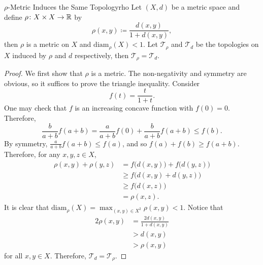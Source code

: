 \documentclass[math]{amznotes}
\theoremstyle{remark}
\begin{document}
\begin{probox}{$\rho$-Metric Induces the Same Topology}{rho}
    Let $\left(X, d\right)$ be a metric space and define $\rho \colon X \times X \to \mathbb{R}$ by 
    \begin{equation*}
        \rho\left(x, y\right) \coloneqq \frac{d\left(x, y\right)}{1 + d\left(x, y\right)},
    \end{equation*}
    then $\rho$ is a metric on $X$ and $\mathrm{diam}_{\rho}\left(X\right) < 1$. Let $\mathcal{T}_{\rho}$ and $\mathcal{T}_d$ be the topologies on $X$ induced by $\rho$ and $d$ respectively, then $\mathcal{T}_{\rho} = \mathcal{T}_d$.
    \tcblower
    \begin{proof}
        We first show that $\rho$ is a metric. The non-negativity and symmetry are obvious, so it suffices to prove the triangle inequality. Consider 
        \begin{equation*}
            f\left(t\right) = \frac{t}{1 + t}.
        \end{equation*}
        One may check that $f$ is an increasing concave function with $f\left(0\right) = 0$. Therefore,
        \begin{equation*}
            \frac{b}{a + b}f\left(a + b\right) = \frac{a}{a + b}f\left(0\right) + \frac{b}{a + b}f\left(a + b\right) \leq f\left(b\right).
        \end{equation*}
        By symmetry, $\frac{a}{a + b}f\left(a + b\right) \leq f\left(a\right)$, and so $f\left(a\right) + f\left(b\right) \geq f\left(a + b\right)$. Therefore, for any $x, y, z \in X$, 
        \begin{align*}
            \rho\left(x, y\right) + \rho\left(y, z\right) & = f\bigl(d\left(x, y\right)\bigr) + f\bigl(d\left(y, z\right)\bigr) \\
            & \geq f\bigl(d\left(x, y\right) + d\left(y, z\right)\bigr) \\
            & \geq f\bigl(d\left(x, z\right)\bigr) \\
            & = \rho\left(x, z\right).
        \end{align*}
        It is clear that $\mathrm{diam}_{\rho}\left(X\right) = \max_{\left(x, y\right) \in X^2}\rho\left(x, y\right) < 1$. Notice that 
        \begin{align*}
            2\rho\left(x, y\right) & = \frac{2d\left(x, y\right)}{1 + d\left(x, y\right)} \\
            & > d\left(x, y\right) \\
            & > \rho\left(x, y\right)
        \end{align*}
        for all $x, y \in X$. Therefore, $\mathcal{T}_d = \mathcal{T}_{\rho}$.
    \end{proof}
\end{probox}
\end{document}
